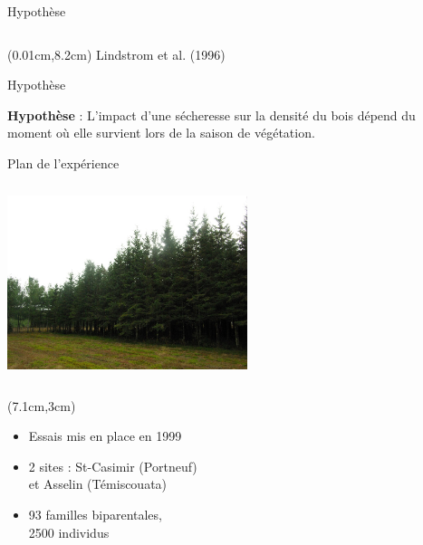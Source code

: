\documentclass{beamer}
\begin{document}
\begin{frame}{Hypothèse}
\begin{columns}
	\end{columns}
 
	\begin{textblock*}{6cm}(0.01cm,8.2cm)	
	\tiny Lindstrom et al. (1996)
	\end{textblock*}
\end{frame}

\begin{frame}{Hypothèse}
	
\Large \textbf{Hypothèse} : L’impact d’une sécheresse sur la densité du bois dépend du moment où elle survient lors de la saison de végétation.
	
\end{frame}


\begin{frame}{Plan de l'expérience}
	
		\includegraphics[height=5.7cm, width=7cm]{Site_etude}
	\begin{textblock*}{9.8cm}(7.1cm,3cm)
		\begin{itemize} %
			\item Essais mis en place en 1999 \\
			\vspace{0.5cm}
			\item 2 sites : St-Casimir (Portneuf)\\
			et Asselin (Témiscouata)\\
			\vspace{0.5cm}
			\item 93 familles biparentales,\\
			 2500 individus \\
		\end{itemize}           
	\end{textblock*}
\end{frame}
\end{document}

